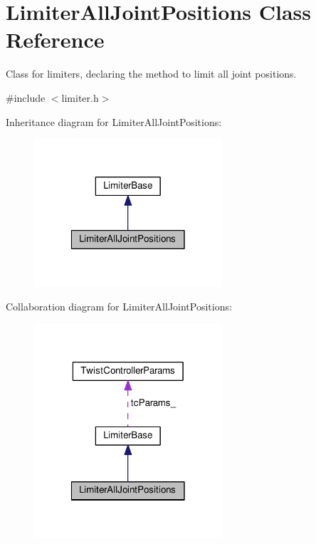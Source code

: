 \hypertarget{classLimiterAllJointPositions}{\section{Limiter\-All\-Joint\-Positions Class Reference}
\label{classLimiterAllJointPositions}
}


Class for limiters, declaring the method to limit all joint positions.  




{\ttfamily \#include $<$limiter.\-h$>$}



Inheritance diagram for Limiter\-All\-Joint\-Positions\-:
\nopagebreak
\begin{figure}[H]
\begin{center}
\leavevmode
\includegraphics[width=198pt]{classLimiterAllJointPositions__inherit__graph}
\end{center}
\end{figure}


Collaboration diagram for Limiter\-All\-Joint\-Positions\-:
\nopagebreak
\begin{figure}[H]
\begin{center}
\leavevmode
\includegraphics[width=198pt]{classLimiterAllJointPositions__coll__graph}
\end{center}
\end{figure}
